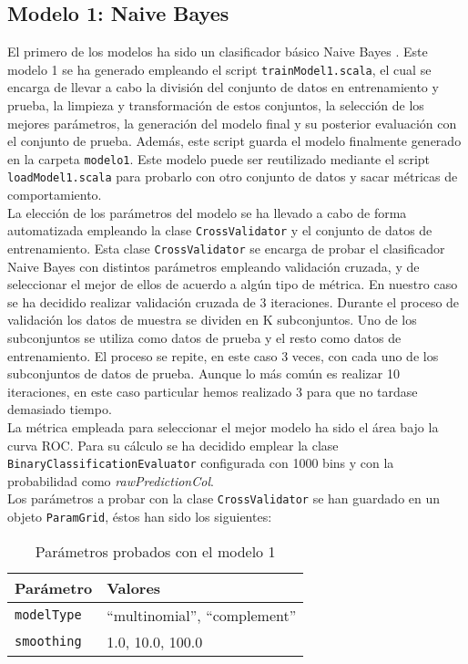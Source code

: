 \documentclass[12pt]{article}
\begin{document}
\subsection{Modelo 1: Naive Bayes}
El primero de los modelos ha sido un clasificador básico Naive Bayes \cite{naive_bayes}. Este modelo 1 se ha generado empleando el script \texttt{trainModel1.scala}, el cual se encarga de llevar a cabo la división del conjunto de datos en entrenamiento y prueba, la limpieza y transformación de estos conjuntos, la selección de los mejores parámetros, la generación del modelo final y su posterior evaluación con el conjunto de prueba. Además, este script guarda el modelo finalmente generado en la carpeta \texttt{modelo1}. Este modelo puede ser reutilizado mediante el script \texttt{loadModel1.scala} para probarlo con otro conjunto de datos y sacar métricas de comportamiento.\\

La elección de los parámetros del modelo se ha llevado a cabo de forma automatizada empleando la clase \texttt{CrossValidator} y el conjunto de datos de entrenamiento. Esta clase \texttt{CrossValidator} se encarga de probar el clasificador Naive Bayes con distintos parámetros empleando validación cruzada, y de seleccionar el mejor de ellos de acuerdo a algún tipo de métrica. En nuestro caso se ha decidido realizar validación cruzada de 3 iteraciones. Durante el proceso de validación los datos de muestra se dividen en K subconjuntos. Uno de los subconjuntos se utiliza como datos de prueba y el resto como datos de entrenamiento. El proceso se repite, en este caso 3 veces, con cada uno de los subconjuntos de datos de prueba. Aunque lo más común es realizar 10 iteraciones, en este caso particular hemos realizado 3 para que no tardase demasiado tiempo.\\

La métrica empleada para seleccionar el mejor modelo ha sido el área bajo la curva ROC. Para su cálculo se ha decidido emplear la clase \texttt{BinaryClassificationEvaluator} configurada con 1000 bins y con la probabilidad como \textit{rawPredictionCol}.\\

Los parámetros a probar con la clase \texttt{CrossValidator} se han guardado en un objeto \texttt{ParamGrid}, éstos han sido los siguientes:

\begin{table}[H]
    \centering
    \begin{tabular}{|p{}|p{}|}
        \hline Parámetro & Valores \\ \hline
        \texttt{modelType} & ``multinomial'', ``complement'' \\ \hline
        \texttt{smoothing} & 1.0, 10.0, 100.0 \\ \hline
    \end{tabular}
    \caption{Parámetros probados con el modelo 1}
    \label{tab:cross_m1}
\end{table}
\end{document}
